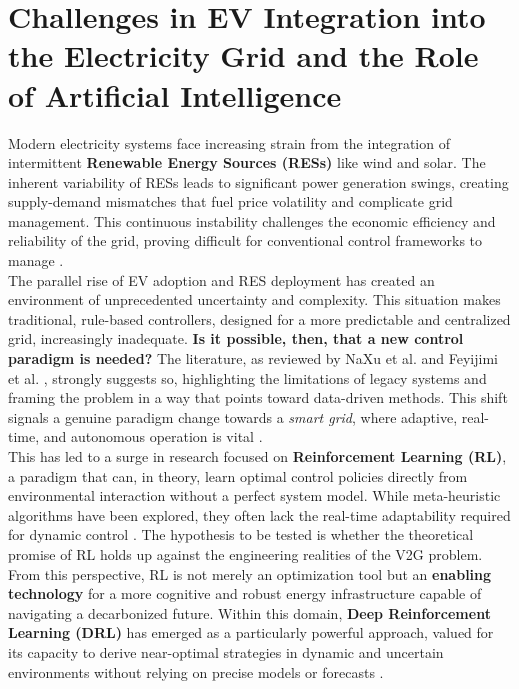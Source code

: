 \section{Challenges in EV Integration into the Electricity Grid and the Role of Artificial Intelligence}
Modern electricity systems face increasing strain from the integration of intermittent \textbf{Renewable Energy Sources (RESs)} like wind and solar. The inherent variability of RESs leads to significant power generation swings, creating supply-demand mismatches that fuel price volatility and complicate grid management. This continuous instability challenges the economic efficiency and reliability of the grid, proving difficult for conventional control frameworks to manage \cite{orfanoudakis2024ev2gym, minchala2025systematic}.
\\
\noindent
The parallel rise of EV adoption and RES deployment has created an environment of unprecedented uncertainty and complexity. This situation makes traditional, rule-based controllers, designed for a more predictable and centralized grid, increasingly inadequate. \textbf{Is it possible, then, that a new control paradigm is needed?} The literature, as reviewed by NaXu et al. \cite{NaXu} and Feyijimi et al. \cite{Feyijimi}, strongly suggests so, highlighting the limitations of legacy systems and framing the problem in a way that points toward data-driven methods. This shift signals a genuine paradigm change towards a \emph{smart grid}, where adaptive, real-time, and autonomous operation is vital \cite{NaXu}.
\\
\noindent
This has led to a surge in research focused on \textbf{Reinforcement Learning (RL)}, a paradigm that can, in theory, learn optimal control policies directly from environmental interaction without a perfect system model. While meta-heuristic algorithms have been explored, they often lack the real-time adaptability required for dynamic control \cite{Srihari}. The hypothesis to be tested is whether the theoretical promise of RL holds up against the engineering realities of the V2G problem. From this perspective, RL is not merely an optimization tool but an \textbf{enabling technology} for a more cognitive and robust energy infrastructure capable of navigating a decarbonized future. Within this domain, \textbf{Deep Reinforcement Learning (DRL)} has emerged as a particularly powerful approach, valued for its capacity to derive near-optimal strategies in dynamic and uncertain environments without relying on precise models or forecasts \cite{orfanoudakis2024ev2gym}.

